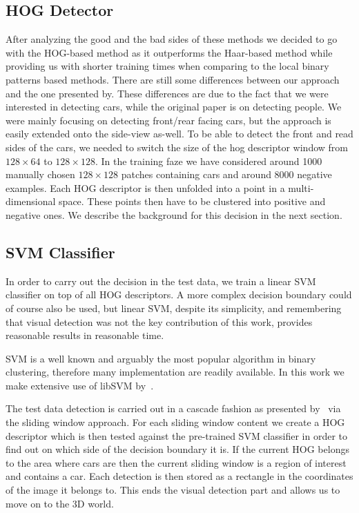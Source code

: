     \subsection{HOG Detector}\label{sub:hog_detector}
        After analyzing the good and the bad sides of these methods we decided to go with the HOG-based method as it outperforms the Haar-based method while providing us with shorter training times when comparing to the local binary patterns based methods.
        There are still some differences between our approach and the one presented by\cite{dalal2005}. These differences are due to the fact that we were interested in detecting cars, while the original paper is on detecting people.
        We were mainly focusing on detecting front/rear facing cars, but the approach is easily extended onto the side-view as-well.
        To be able to detect the front and read sides of the cars, we needed to switch the size of the hog descriptor window from $128 \times 64$ to $128 \times 128$.
        In the training faze we have considered around 1000 manually chosen $128 \times 128$ patches containing cars and around 8000 negative examples. Each HOG descriptor is then unfolded into a point in a multi-dimensional space. These points then have to be clustered into positive and negative ones. We describe the background for this decision in the next section.

    \subsection{SVM Classifier}\label{sub:svm_classifier}

        In order to carry out the decision in the test data, we train a linear SVM classifier on top of all HOG descriptors.
        A more complex decision boundary could of course also be used, but linear SVM, despite its simplicity, and remembering that visual detection was not the key contribution of this work, provides reasonable results in reasonable time.

        SVM is a well known and arguably the most popular algorithm in binary clustering, therefore many implementation are readily available. In this work we make extensive use of libSVM by~\cite{libSVM2011}.

        The test data detection is carried out in a cascade fashion as presented by~\cite{violajones2001} via the sliding window approach. For each sliding window content we create a HOG descriptor which is then tested against the pre-trained SVM classifier in order to find out on which side of the decision boundary it is. If the current HOG belongs to the area where cars are then the current sliding window is a region of interest and contains a car.
        Each detection is then stored as a rectangle in the coordinates of the image it belongs to.
        This ends the visual detection part and allows us to move on to the 3D world.

